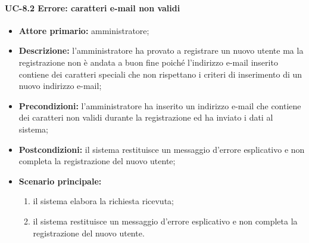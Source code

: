     \paragraph{UC-8.2 Errore: caratteri e-mail non validi}
    \begin{itemize}
        \item \textbf{Attore primario:} amministratore;
    
        \item \textbf{Descrizione:} l'amministratore ha provato a registrare un nuovo utente ma la registrazione non è andata a buon fine poiché l'indirizzo e-mail inserito contiene dei caratteri speciali che non rispettano i criteri di inserimento di un nuovo indirizzo e-mail;
    
        \item \textbf{Precondizioni:} l'amministratore ha inserito un indirizzo e-mail che contiene dei caratteri non validi durante la registrazione ed ha inviato i dati al sistema;
    
        \item \textbf{Postcondizioni:} il sistema restituisce un messaggio d'errore esplicativo e non completa la registrazione del nuovo utente;
    
        \item \textbf{Scenario principale:}
              \begin{enumerate}
                  \item il sistema elabora la richiesta ricevuta;
                  \item il sistema restituisce un messaggio d'errore esplicativo e non completa la registrazione del nuovo utente.
              \end{enumerate}
    \end{itemize}

